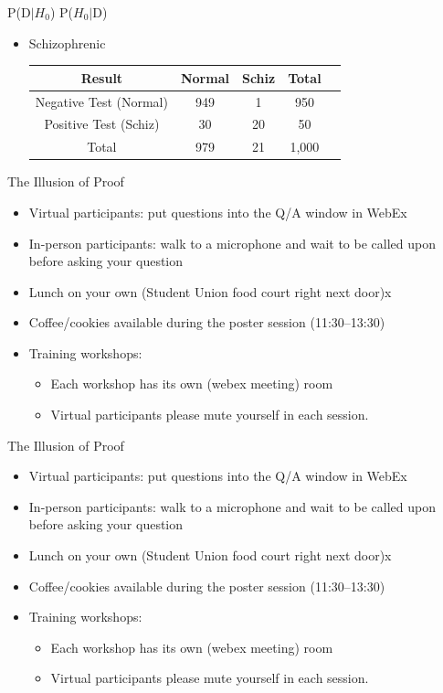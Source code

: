\documentclass[aspectratio=169, 12pt]{beamer}
\begin{document}
\begin{frame}{P(D$|$$H_0$) \neq P($H_0$$|$D)}
  \begin{itemize}
  \item Schizophrenic
    \begin{tabular}{ccccc}
      \toprule
     Result &   Normal & Schiz & Total \\
      \midrule
      Negative Test (Normal)  &  949     &   1           &  950        \\
      Positive Test (Schiz)  &  30      &    20          &  50        \\
      Total    &  979      & 21          & 1,000         \\
      \bottomrule
    \end{tabular}
  \end{itemize}
\end{frame}

\begin{frame}{The Illusion of Proof}
  \begin{itemize}
  \item Virtual participants: put questions into the Q/A window in WebEx
  \item In-person participants: walk to a microphone and wait to be called upon
    before asking your question
  \item Lunch on your own (Student Union food court right next door)x
  \item Coffee/cookies available during the poster session (11:30--13:30)
  \item Training workshops:
    \begin{itemize}
    \item Each workshop has its own (webex meeting) room
    \item Virtual participants please mute yourself in each session.
    \end{itemize}
  \end{itemize}
\end{frame}

\begin{frame}{The Illusion of Proof}
  \begin{itemize}
  \item Virtual participants: put questions into the Q/A window in WebEx
  \item In-person participants: walk to a microphone and wait to be called upon
    before asking your question
  \item Lunch on your own (Student Union food court right next door)x
  \item Coffee/cookies available during the poster session (11:30--13:30)
  \item Training workshops:
    \begin{itemize}
    \item Each workshop has its own (webex meeting) room
    \item Virtual participants please mute yourself in each session.
    \end{itemize}
  \end{itemize}
\end{frame}
\end{document}
